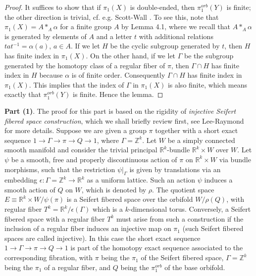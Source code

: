 \documentclass[11pt]{amsart}
\theoremstyle{plain}
\numberwithin{theorem}{section}
\theoremstyle{definition}
\begin{document}
\begin{proof}
It suffices to show that if $\pi_1(X)$ is double-ended, then $\pi_1^{orb}(Y)$ is finite; 
the other direction is trivial, cf. e.g. Scott-Wall \cite{SW}. To see this,  note that 
$\pi_1(X)=A\ast_A\alpha$ for a finite group $A$ by Lemma 4.1, where we recall that 
$A\ast_A\alpha$ is generated by elements of $A$ and a letter $t$ with additional relations 
$tat^{-1}=\alpha(a)$, $a\in A$. If we let $H$ be the cyclic subgroup generated by $t$, 
then $H$ has finite index in $\pi_1(X)$. On the other hand, if we let $\Gamma$ be the subgroup 
generated by the homotopy class of a regular fiber of $\pi$, then $\Gamma\cap H$ has 
finite index in $H$ because $\alpha$ is of finite order. Consequently $\Gamma\cap H$ has finite 
index in $\pi_1(X)$. This implies that the index of $\Gamma$ in $\pi_1(X)$ is also finite, 
which means exactly that $\pi_1^{orb}(Y)$ is finite. Hence the lemma. 
\end{proof}


\vspace{3mm}

{\bf Part (1)}. The proof for this part is based on the rigidity of 
{\it injective Seifert fibered space construction}, which we shall briefly review first, 
see Lee-Raymond \cite{LR0} for more details. 
Suppose we are given a group $\pi$ together with
a short exact sequence $1\rightarrow \Gamma\rightarrow \pi\rightarrow Q\rightarrow 1$, where 
$\Gamma={{\mathbb Z}}^k$. Let $W$ be a simply connected smooth manifold and consider the trivial principal
${{\mathbb R}}^k$-bundle ${{\mathbb R}}^k\times W$ over $W$. Let $\psi$ be a smooth, free and properly discontinuous action of $\pi$ on ${{\mathbb R}}^k\times W$ via bundle morphisms, such that the restriction $\psi|_\Gamma$ 
is given by translations via an embedding $\epsilon: \Gamma={{\mathbb Z}}^k\rightarrow {{\mathbb R}}^k$ as a uniform lattice.  Such an action $\psi$ induces a smooth action of $Q$ on $W$, which is denoted by $\rho$. The quotient space $E\equiv {{\mathbb R}}^k\times W/\psi(\pi)$ is a Seifert fibered space over the orbifold 
$W/\rho(Q)$, with regular fiber $T^k={{\mathbb R}}^k/\epsilon(\Gamma)$ which is a $k$-dimensional torus. 
Conversely, a Seifert fibered space with a regular fiber $T^k$ must arise from such a construction
if the inclusion of a regular fiber induces an injective map on $\pi_1$ (such Seifert fibered spaces
are called injective). In this case the short exact sequence $1\rightarrow \Gamma\rightarrow \pi\rightarrow Q\rightarrow 1$ is part of the homotopy exact sequence associated to the corresponding fibration, with $\pi$ being the $\pi_1$ of the Seifert fibered space, $\Gamma={{\mathbb Z}}^k$ being the $\pi_1$ of a 
regular fiber, and $Q$ being the $\pi_1^{orb}$ of the base orbifold. 
\end{document}
